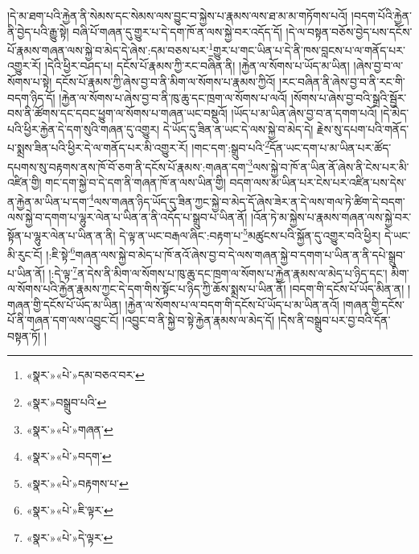 །དེ་མ་ཐག་པའི་རྐྱེན་ནི་སེམས་དང་སེམས་ལས་བྱུང་བ་སྐྱེས་པ་རྣམས་ལས་ཐ་མ་མ་གཏོགས་པའོ། །བདག་པོའི་རྐྱེན་ནི་བྱེད་པའི་རྒྱུ་སྟེ། བཞི་པོ་གཞན་དུ་གྱུར་པ་དེ་དག་ཁོ་ན་ལས་སྐྱེ་བར་འདོད་དོ། །དེ་ལ་བསྟན་བཅོས་བྱེད་པས་དངོས་པོ་རྣམས་གཞན་ལས་སྐྱེ་བ་མེད་དེ་ཞེས་:དམ་བཅས་པར་\footnote{«སྣར་»«པེ་»དམ་བཅའ་བར་}གྱུར་པ་གང་ཡིན་པ་དེ་ནི་ཁས་བླངས་པ་ལ་གནོད་པར་འགྱུར་རོ། །དེའི་ཕྱིར་བཤད་པ། དངོས་པོ་རྣམས་ཀྱི་རང་བཞིན་ནི། །རྐྱེན་ལ་སོགས་པ་ཡོད་མ་ཡིན། །ཞེས་བྱ་བ་ལ་སོགས་པ་སྟེ། དངོས་པོ་རྣམས་ཀྱི་ཞེས་བྱ་བ་ནི་མིག་ལ་སོགས་པ་རྣམས་ཀྱིའོ། །རང་བཞིན་ནི་ཞེས་བྱ་བ་ནི་རང་གི་བདག་ཉིད་དོ། །རྐྱེན་ལ་སོགས་པ་ཞེས་བྱ་བ་ནི་ཁུ་ཆུ་དང་ཁྲག་ལ་སོགས་པ་ལའོ། །སོགས་པ་ཞེས་བྱ་བའི་སྒྲའི་སྦྱོར་བས་ནི་ཚོགས་དང་དབང་ཕྱུག་ལ་སོགས་པ་གཞན་ཡང་བསྡུའོ། །ཡོད་པ་མ་ཡིན་ཞེས་བྱ་བ་ན་དགག་པའོ། །དེ་མེད་པའི་ཕྱིར་རྐྱེན་དེ་དག་སུའི་གཞན་དུ་འགྱུར། དེ་ཡོད་དུ་ཟིན་ན་ཡང་དེ་ལས་སྐྱེ་བ་མེད་དེ། རྗེས་སུ་དཔག་པའི་གནོད་པ་སྨྲས་ཟིན་པའི་ཕྱིར་དེ་ལ་གནོད་པར་མི་འགྱུར་རོ། །གང་དག་:སྒྲུབ་པའི་\footnote{«སྣར་»བསྒྲུབ་པའི་}དོན་ཡང་དག་པ་མ་ཡིན་པར་ཚོད་དཔགས་སུ་བརྟགས་ནས་ཁོ་བོ་ཅག་ནི་དངོས་པོ་རྣམས་:གཞན་དག་\footnote{«སྣར་»«པེ་»གཞན་}ལས་སྐྱེ་བ་ཁོ་ན་ཡིན་ནོ་ཞེས་ནི་ངེས་པར་མི་འཛིན་གྱི། གང་དག་སྐྱེ་བ་དེ་དག་ནི་གཞན་ཁོ་ན་ལས་ཡིན་གྱི། བདག་ལས་མ་ཡིན་པར་ངེས་པར་འཛིན་པས་དེས་ན་རྐྱེན་མ་ཡིན་པ་དག་\footnote{«སྣར་»«པེ་»བདག་}ལས་གཞན་ཉིད་ཡོད་དུ་ཟིན་ཀྱང་སྐྱེ་བ་མེད་དོ་ཞེས་ཟེར་ན་དེ་ལས་གལ་ཏེ་ཚིག་དེ་བདག་ལས་སྐྱེ་བ་དགག་པ་ལྷུར་ལེན་པ་ཡིན་ན་ནི་འདོད་པ་སྒྲུབ་པ་ཡིན་ནོ། །འོན་ཏེ་མ་སྐྱེས་པ་རྣམས་གཞན་ལས་སྐྱེ་བར་སྟོན་པ་ལྷུར་ལེན་པ་ཡིན་ན་ནི། དེ་ལྟ་ན་ཡང་བརྒལ་ཞིང་:བརྟག་པ་\footnote{«སྣར་»«པེ་»བརྟགས་པ་}མཚུངས་པའི་སྐྱོན་དུ་འགྱུར་བའི་ཕྱིར། དེ་ཡང་མི་རུང་ངོ། །:ཇི་སྟེ་\footnote{«སྣར་»«པེ་»ཇི་ལྟར་}གཞན་ལས་སྐྱེ་བ་མེད་པ་ཁོ་ནའོ་ཞེས་བྱ་བ་དེ་ལས་གཞན་སྐྱེ་བ་དགག་པ་ཡིན་ན་ནི་དཔེ་སྒྲུབ་པ་ཡིན་ནོ། །:དེ་ལྟ་\footnote{«སྣར་»«པེ་»དེ་ལྟར་}ན་དེས་ནི་མིག་ལ་སོགས་པ་ཁུ་ཆུ་དང་ཁྲག་ལ་སོགས་པ་རྐྱེན་རྣམས་ལ་མེད་པ་ཉིད་དང་། མིག་ལ་སོགས་པའི་རྐྱེན་རྣམས་ཀྱང་དེ་དག་གིས་སྟོང་པ་ཉིད་ཀྱི་ཆོས་སྨྲས་པ་ཡིན་ནོ། །བདག་གི་དངོས་པོ་ཡོད་མིན་ན། །གཞན་གྱི་དངོས་པོ་ཡོད་མ་ཡིན། །རྐྱེན་ལ་སོགས་པ་ལ་བདག་གི་དངོས་པོ་ཡོད་པ་མ་ཡིན་ནའོ། །གཞན་གྱི་དངོས་པོ་ནི་གཞན་དག་ལས་འབྱུང་ངོ། །འབྱུང་བ་ནི་སྐྱེ་བ་སྟེ་རྐྱེན་རྣམས་ལ་མེད་དོ། །དེས་ནི་བསྒྲུབ་པར་བྱ་བའི་དོན་བསྟན་ཏོ། །

